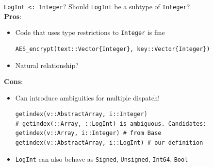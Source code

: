 \begin{frame}[fragile]{\texttt{LogInt <: Integer}?}
    Should \texttt{LogInt} be a subtype of \texttt{Integer}? \\

    \textbf{Pros}:
            \begin{itemize}
                \item Code that uses type restrictions to \texttt{Integer} is fine
\begin{verbatim}
AES_encrypt(text::Vector{Integer}, key::Vector{Integer})
\end{verbatim}
                \item Natural relationship?
            \end{itemize}
    \vspace{0.5em}

    \textbf{Cons}:
            \begin{itemize}
                \item Can introduce ambiguities for multiple dispatch! \\
                    \begin{verbatim}
getindex(v::AbstractArray, i::Integer)
# getindex(::Array, ::LogInt) is ambiguous. Candidates:
getindex(v::Array, i::Integer) # from Base
getindex(v::AbstractArray, i::LogInt) # our definition
                \end{verbatim}
                \item \texttt{LogInt} can also behave as \texttt{Signed}, \texttt{Unsigned}, \texttt{Int64}, \texttt{Bool} %
            \end{itemize}

\end{frame}


